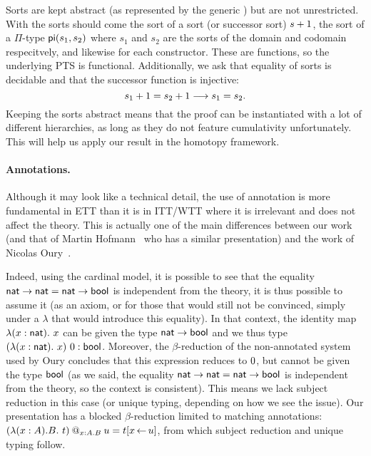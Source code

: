 Sorts are kept abstract (as represented by the generic \cS) but are not
unrestricted. With the sorts should come the sort of a sort (or successor
sort) \(s+1\), the sort of a \(\Pi\)-type \(\mathsf{pi}(s_1,s_2)\)
where \(s_1\) and \(s_2\) are the sorts of the domain and codomain respecitvely,
and likewise for each constructor.
These are functions, so the underlying \acrshort{PTS} is functional.
Additionally, we ask that equality of sorts is decidable and that the successor
function is injective:
\[
  s_1+1 = s_2+1 \longrightarrow s_1 = s_2.
\]
Keeping the sorts abstract means that the proof can be instantiated with a lot
of different hierarchies, as long as they do not feature cumulativity
unfortunately. This will help us apply our result in the homotopy framework.

\paragraph{Annotations.}

Although it may look like a technical detail, the use of annotation is more
fundamental in \acrshort{ETT} than it is in \acrshort{ITT}/\acrshort{WTT}
where it is irrelevant and does not affect the theory.
This is actually one of the main differences between our work
(and that of Martin Hofmann~ who has a
similar presentation) and the work of Nicolas
Oury~.

Indeed, using the cardinal model, it is possible to see that the equality
$\mathsf{nat} \to \mathsf{nat} = \mathsf{nat} \to \mathsf{bool}$ is independent from the theory, it is
thus possible to assume it (as an axiom, or for those that would still
not be convinced, simply under a $\lambda$ that would introduce this
equality).  In that context, the identity map $\lambda(x : \mathsf{nat}).\ x$
can be given the type $\mathsf{nat} \to \mathsf{bool}$ and we thus type
$(\lambda(x : \mathsf{nat}).\ x)\ 0 : \mathsf{bool}$.  Moreover, the
$\beta$-reduction of the non-annotated system used by Oury concludes
that this expression reduces to $0$, but cannot be given the type
$\mathsf{bool}$ (as we said, the equality $\mathsf{nat} \to \mathsf{nat} = \mathsf{nat} \to \mathsf{bool}$ is
independent from the theory, so the context is consistent). This means
we lack subject reduction in this case (or unique typing,
depending on how we see the issue).  Our presentation has a blocked
$\beta$-reduction limited to matching annotations:
$(\lambda (x:A). B .\ t)\mathbin{@_{x:A.B}} u = t[x \mathop{\leftarrow} u]$, from which subject
reduction and unique typing follow.

